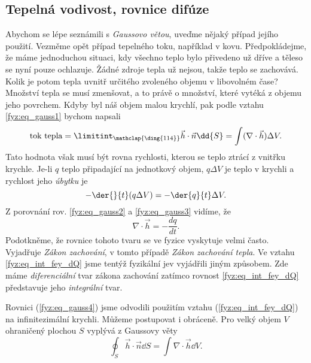     \subsection{Tepelná vodivost, rovnice difúze}
      Abychom se lépe seznámili s \emph{Gaussovo větou}, uveďme nějaký případ jejího použití. 
      Vezměme opět případ tepelného toku, například v kovu. Předpokládejme, že máme jednoduchou 
      situaci, kdy všechno teplo bylo přivedeno už dříve a těleso se nyní pouze ochlazuje. Žádné 
      zdroje tepla už nejsou, takže teplo se zachovává. Kolik je potom tepla uvnitř určitého 
      zvoleného objemu v libovolném čase? Množství tepla se musí zmenšovat, a to právě o množství, 
      které vytéká z objemu jeho povrchem. Kdyby byl náš objem malou krychlí, pak podle vztahu
      \ref{fyz:eq_gauss1} bychom napsali
      \begin{equation}\label{fyz:eq_gauss2}
       \text{tok 
       tepla}=\limitint_{\mathclap{\substack{\text{\ding{114}}}}}\vec{h}\cdot\vec{n}\dd{S} = 
       \int(\nabla\cdot\vec{h})\Delta V.
      \end{equation}
      Tato hodnota však musí být rovna rychlosti, kterou se teplo ztrácí z vnitřku krychle. Je-li 
      $q$ teplo připadající na jednotkový objem, $q\Delta V$ je teplo v krychli a rychlost jeho
      \emph{úbytku} je
      \begin{equation}\label{fyz:eq_gauss3}
       - \der{ }{t}(q\Delta V) = - \der{q}{t}\Delta V.
      \end{equation}
      Z porovnání rov. \ref{fyz:eq_gauss2} a \ref{fyz:eq_gauss3} vidíme, že 
      \begin{equation}\label{fyz:eq_gauss4}
        \nabla\cdot\vec{h} = - \frac{dq}{dt}. 
      \end{equation}
      Podotkněme, že rovnice tohoto tvaru se ve fyzice vyskytuje velmi často. Vyjadřuje \emph{Zákon 
      zachování}, v tomto případě \emph{Zákon zachování tepla}. Ve vztahu \ref{fyz:eq_int_fey_dQ} 
      jsme tentýž fyzikální jev vyjádřili jiným způsobem. Zde máme \emph{diferenciální} tvar zákona 
      zachování zatímco rovnost \ref{fyz:eq_int_fey_dQ} představuje jeho \emph{integrální} tvar.
      
      Rovnici (\ref{fyz:eq_gauss4}) jsme odvodili použitím vztahu (\ref{fyz:eq_int_fey_dQ}) na 
      infinitezimální krychli. Můžeme postupovat i obráceně. Pro velký objem \(V\) ohraničený 
      plochou \(S\) vyplývá z Gaussovy věty
      \begin{equation}\label{fyz:eq_gauss5}
        \oint_S\vec{h}\cdot\vec{n}\dd{S} = \int\nabla\cdot\vec{h}\dd{V}.
      \end{equation}
      
